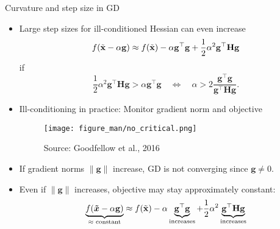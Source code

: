 \documentclass[11pt,compress,t,notes=noshow, xcolor=table]{beamer}
\begin{document}
\begin{vbframe}{Curvature and step size in GD}
\framebreak

\begin{itemize}
    \item Large step sizes for ill-conditioned Hessian can even increase
        \vspace{-0.5\baselineskip}
        \begin{equation*}
            f(\tilde{\mathbf{x}} - \alpha \mathbf{g}) \approx f(\tilde{\mathbf{x}}) - \alpha \mathbf{g}^\top \mathbf{g} + \frac{1}{2} \alpha^2 \mathbf{g}^\top \mathbf{H} \mathbf{g}
        \end{equation*}
        if $$\frac{1}{2} \alpha^2 \mathbf{g}^\top \mathbf{H} \mathbf{g} > \alpha \mathbf{g}^\top\mathbf{g} \quad \Leftrightarrow \quad \alpha > 2\frac{\mathbf{g}^\top \mathbf{g}}{\mathbf{g}^\top \mathbf{H} \mathbf{g}}.$$
    \item Ill-conditioning in practice: Monitor gradient norm and objective
        \begin{figure}
        	\centering
        	\texttt{[image: figure\_man/no\_critical.png]}
        	\caption*{\centering \footnotesize Source: Goodfellow et al., 2016}
        \end{figure}
\end{itemize}

\framebreak

\begin{itemize}
    \setlength{\itemsep}{1em}
    \item If gradient norms $\|\mathbf{g}\|$ increase, GD is not converging since $\mathbf{g} \not= 0$.
    \item Even if $\|\mathbf{g}\|$ increases, objective may stay approximately constant:
        \begin{equation*}
            \underbrace{f(\bm{\tilde{x}}-\alpha \mathbf{g})}_{\text{$\approx$ constant}} \approx f(\tilde{\mathbf{x}}) - \alpha \underbrace{\mathbf{g}^\top \mathbf{g}}_{\text{increases}} + \frac{1}{2} \alpha^2 \underbrace{\mathbf{g}^\top \mathbf{H} \mathbf{g}}_{\text{increases}}
        \end{equation*}
\end{itemize}

\end{vbframe}


	
\end{document}
